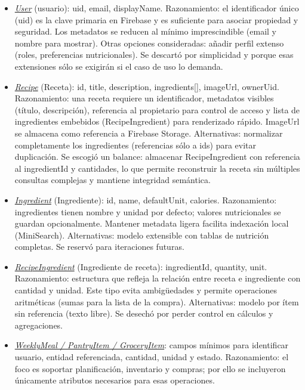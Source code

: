 \documentclass[twoside, openright, 11pt]{report}
\begin{document}
				\begin{itemize}
					\item \textit{\underline{User}} (usuario): uid, email, displayName.  
					Razonamiento: el identificador único (uid) es la clave primaria en Firebase y es suficiente para asociar propiedad y seguridad. Los metadatos se reducen al mínimo imprescindible (email y nombre para mostrar).
					Otras opciones consideradas: añadir perfil extenso (roles, preferencias nutricionales). Se descartó por simplicidad y porque esas extensiones sólo se exigirán si el caso de uso lo demanda.
					
					\item \label{Recipe}
					\textit{\underline{Recipe}} (Receta): id, title, description, ingredients[], imageUrl, ownerUid.  
					Razonamiento: una receta requiere un identificador, metadatos visibles (título, descripción), referencia al propietario para control de acceso y lista de ingredientes embebidos (RecipeIngredient) para renderizado rápido. ImageUrl se almacena como referencia a Firebase Storage.
					Alternativas: normalizar completamente los ingredientes (referencias sólo a ids) para evitar duplicación. Se escogió un balance: almacenar RecipeIngredient con referencia al ingredientId y cantidades, lo que permite reconstruir la receta sin múltiples consultas complejas y mantiene integridad semántica.
					
					\item \label{Ingredient}
					\textit{\underline{Ingredient}} (Ingrediente): id, name, defaultUnit, calories.  
					Razonamiento: ingredientes tienen nombre y unidad por defecto; valores nutricionales se guardan opcionalmente. Mantener metadata ligera facilita indexación local (MiniSearch).
					Alternativas: modelo extensible con tablas de nutrición completas. Se reservó para iteraciones futuras.
					
					\item \textit{\underline{RecipeIngredient}} (Ingrediente de receta): ingredientId, quantity, unit.  
					Razonamiento: estructura que refleja la relación entre receta e ingrediente con cantidad y unidad. Este tipo evita ambigüedades y permite operaciones aritméticas (sumas para la lista de la compra).
					Alternativas: modelo por ítem sin referencia (texto libre). Se desechó por perder control en cálculos y agregaciones.
					
					\item \textit{\underline{WeeklyMeal / PantryItem / GroceryItem}}: campos mínimos para identificar usuario, entidad referenciada, cantidad, unidad y estado.  
					Razonamiento: el foco es soportar planificación, inventario y compras; por ello se incluyeron únicamente atributos necesarios para esas operaciones.
				\end{itemize}
			
\end{document}

